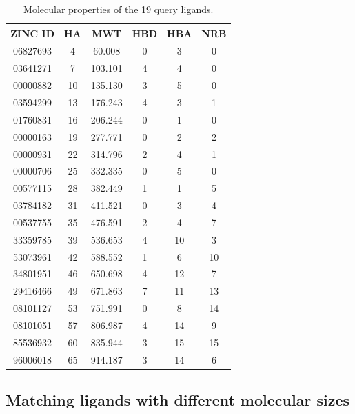 \begin{table}
\caption{Molecular properties of the 19 query ligands.}
\label{usr:Queries}
\begin{tabular}{cccccc}
\hline
ZINC ID  & HA & MWT & HBD & HBA & NRB\\
\hline
06827693 &  4 &  60.008 & 0 &  3 &  0\\
03641271 &  7 & 103.101 & 4 &  4 &  0\\
00000882 & 10 & 135.130 & 3 &  5 &  0\\
03594299 & 13 & 176.243 & 4 &  3 &  1\\
01760831 & 16 & 206.244 & 0 &  1 &  0\\
00000163 & 19 & 277.771 & 0 &  2 &  2\\
00000931 & 22 & 314.796 & 2 &  4 &  1\\
00000706 & 25 & 332.335 & 0 &  5 &  0\\
00577115 & 28 & 382.449 & 1 &  1 &  5\\
03784182 & 31 & 411.521 & 0 &  3 &  4\\
00537755 & 35 & 476.591 & 2 &  4 &  7\\
33359785 & 39 & 536.653 & 4 & 10 &  3\\
53073961 & 42 & 588.552 & 1 &  6 & 10\\
34801951 & 46 & 650.698 & 4 & 12 &  7\\
29416466 & 49 & 671.863 & 7 & 11 & 13\\
08101127 & 53 & 751.991 & 0 &  8 & 14\\
08101051 & 57 & 806.987 & 4 & 14 &  9\\
85536932 & 60 & 835.944 & 3 & 15 & 15\\
96006018 & 65 & 914.187 & 3 & 14 &  6\\
\hline
\end{tabular}
\end{table}

\subsection{Matching ligands with different molecular sizes}

